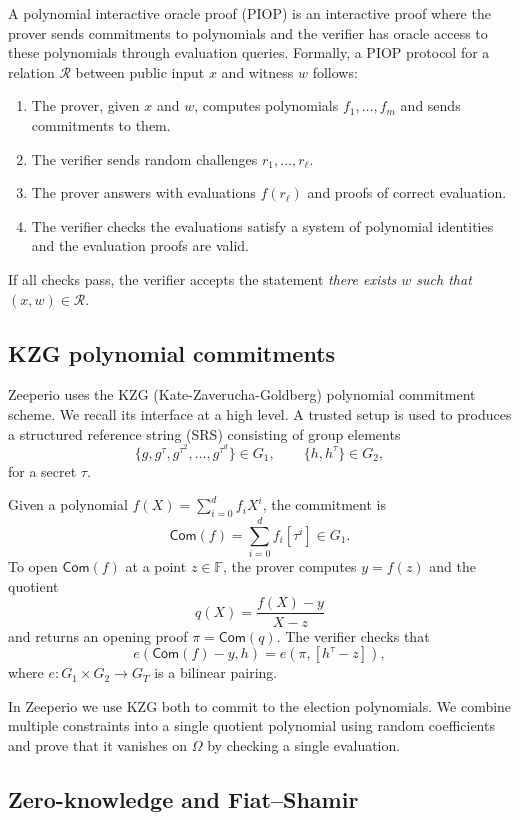 A polynomial interactive oracle proof (PIOP) is an interactive proof where the prover sends commitments to polynomials and the verifier has oracle access to these polynomials through evaluation queries.
Formally, a PIOP protocol for a relation $\mathcal{R}$ between public input $x$ and witness $w$ follows:
\begin{enumerate}[label=(\roman*)]
  \item The prover, given $x$ and $w$, computes polynomials $f_1,\dots,f_m$ and sends commitments to them.
  \item The verifier sends random challenges $r_1,\dots,r_\ell$.
  \item The prover answers with evaluations $f(r_\ell)$ and proofs of correct evaluation.
  \item The verifier checks the evaluations satisfy a system of polynomial identities and the evaluation proofs are valid.
\end{enumerate}
If all checks pass, the verifier accepts the statement \emph{there exists $w$ such that $(x,w) \in \mathcal{R}$}.

\subsection{KZG polynomial commitments}

Zeeperio uses the KZG (Kate-Zaverucha-Goldberg) polynomial commitment scheme.
We recall its interface at a high level.
A trusted setup is used to produces a structured reference string (SRS) consisting of group elements
\[
  \{g, g^\tau, g^{\tau^2}, \ldots, g^{\tau^d}\} \in G_1, \qquad \{h, h^\tau\} \in G_2,
\]
for a secret $\tau$.

Given a polynomial $f(X) = \sum_{i=0}^d f_i X^i$, the commitment is
\[
  \mathsf{Com}(f) = \sum_{i=0}^d f_i [\tau^i] \in G_1.
\]
To open $\mathsf{Com}(f)$ at a point $z \in \mathbb{F}$, the prover computes $y = f(z)$ and the quotient
\[
  q(X) = \frac{f(X) - y}{X - z}
\]
and returns an opening proof $\pi = \mathsf{Com}(q)$.
The verifier checks that
\[
  e(\mathsf{Com}(f) - y, h) = e(\pi, [h^\tau - z]),
\]
where $e : G_1 \times G_2 \to G_T$ is a bilinear pairing.

In Zeeperio we use KZG both to commit to the election polynomials.
We combine multiple constraints into a single quotient polynomial using random coefficients and prove that it vanishes on $\Omega$ by checking a single evaluation.

\subsection{Zero-knowledge and Fiat--Shamir}

